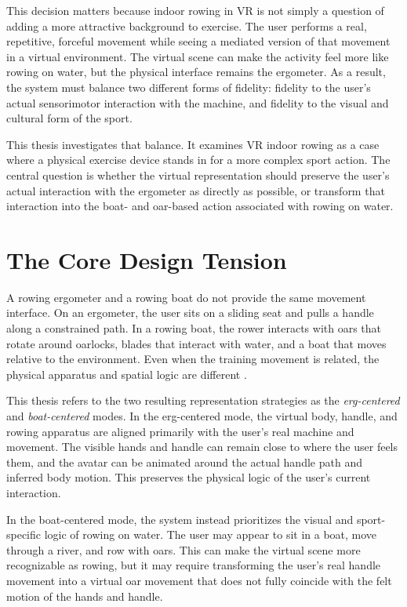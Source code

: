 This decision matters because indoor rowing in VR is not simply a question of adding a more attractive background to exercise. The user performs a real, repetitive, forceful movement while seeing a mediated version of that movement in a virtual environment. The virtual scene can make the activity feel more like rowing on water, but the physical interface remains the ergometer. As a result, the system must balance two different forms of fidelity: fidelity to the user's actual sensorimotor interaction with the machine, and fidelity to the visual and cultural form of the sport.

This thesis investigates that balance. It examines VR indoor rowing as a case where a physical exercise device stands in for a more complex sport action. The central question is whether the virtual representation should preserve the user's actual interaction with the ergometer as directly as possible, or transform that interaction into the boat- and oar-based action associated with rowing on water.

\section{The Core Design Tension}
\label{sec:introduction_core_design_tension}

A rowing ergometer and a rowing boat do not provide the same movement interface. On an ergometer, the user sits on a sliding seat and pulls a handle along a constrained path. In a rowing boat, the rower interacts with oars that rotate around oarlocks, blades that interact with water, and a boat that moves relative to the environment. Even when the training movement is related, the physical apparatus and spatial logic are different \parencite{lamb1989kinematicComparison,soperHume2004rowingTechnique,rauterEtAl2013rowingTransfer}.

This thesis refers to the two resulting representation strategies as the \emph{erg-centered} and \emph{boat-centered} modes. In the erg-centered mode, the virtual body, handle, and rowing apparatus are aligned primarily with the user's real machine and movement. The visible hands and handle can remain close to where the user feels them, and the avatar can be animated around the actual handle path and inferred body motion. This preserves the physical logic of the user's current interaction.

In the boat-centered mode, the system instead prioritizes the visual and sport-specific logic of rowing on water. The user may appear to sit in a boat, move through a river, and row with oars. This can make the virtual scene more recognizable as rowing, but it may require transforming the user's real handle movement into a virtual oar movement that does not fully coincide with the felt motion of the hands and handle.

